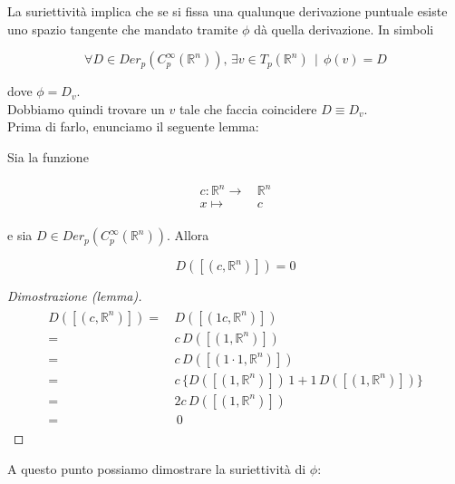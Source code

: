La suriettività implica che se si fissa una qualunque derivazione puntuale esiste uno spazio tangente che mandato tramite $ \phi $ dà quella derivazione. In simboli

\begin{equation}
	\forall D \in Der_{p} (C_{p}^{\infty}(\mathbb{R}^{n})), \, \exists v \in T_{p}(\mathbb{R}^{n}) \, \mid \, \phi(v) = D
\end{equation}

dove $ \phi = D_{v} $.\\
Dobbiamo quindi trovare un $ v $ tale che faccia coincidere $ D \equiv D_{v} $.\\
Prima di farlo, enunciamo il seguente lemma:

\begin{lemma}
	Sia la funzione
	
	\begin{align}
		\begin{split}
			c : \mathbb{R}^{n} \to& \, \mathbb{R}^{n}\\
			x \mapsto& \, c
		\end{split}
	\end{align}

	e sia $ D \in Der_{p} (C_{p}^{\infty}(\mathbb{R}^{n})) $. Allora
	
	\begin{equation}
		D([(c,\mathbb{R}^{n})]) = 0
	\end{equation}
\end{lemma}

\begin{proof}[Dimostrazione (lemma)]
	\begin{align}
		\begin{split}
			D([(c,\mathbb{R}^{n})]) =& \, D([(1 c,\mathbb{R}^{n})])\\
			=& \, c \, D([(1,\mathbb{R}^{n})])\\
			=& \, c \, D([(1 \cdot 1,\mathbb{R}^{n})])\\
			=& \, c \, \{D([(1,\mathbb{R}^{n})]) \, 1 + 1 \, D([(1,\mathbb{R}^{n})])\}\\
			=& \, 2 c \, D([(1,\mathbb{R}^{n})])\\
			=& \, \, 0
		\end{split}
	\end{align}
\end{proof}

A questo punto possiamo dimostrare la suriettività di $ \phi $:

